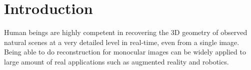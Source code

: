 
\vspace{-0\baselineskip}
\section{Introduction}
\label{sec:intro}
\vspace{-0\baselineskip}

Human beings are highly competent in recovering the 3D geometry of observed natural scenes at a very detailed level in real-time, even from a single image. 
Being able to do reconstruction for monocular images can be widely applied to large amount of real applications such as augmented reality and robotics.


